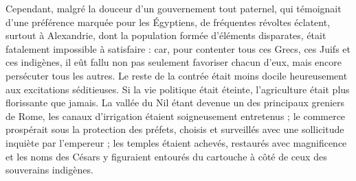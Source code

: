 \documentclass[letterpaper,twocolumn,openany,nodeprecatedcode]{dndbook}
\begin{document}
Cependant, malgré la douceur d'un gouvernement tout paternel, qui témoignait d'une préférence marquée pour les Égyptiens, de fréquentes révoltes éclatent, surtout à Alexandrie, dont la population formée d'éléments disparates, était fatalement impossible à satisfaire : car, pour contenter tous ces Grecs, ces Juifs et ces indigènes, il eût fallu non pas seulement favoriser chacun d'eux, mais encore persécuter tous les autres. Le reste de la contrée était moins docile heureusement aux excitations séditieuses. Si la vie politique était éteinte, l'agriculture était plus florissante que jamais. La vallée du Nil étant devenue un des principaux greniers de Rome, les canaux d'irrigation étaient soigneusement entretenus ; le commerce prospérait sous la protection des préfets, choisis et surveillés avec une sollicitude inquiète par l'empereur ; les temples étaient achevés, restaurés avec magnificence et les noms des Césars y figuraient entourés du cartouche à côté de ceux des souverains indigènes.
\end{document}
